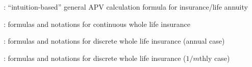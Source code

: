 \item {}: ``intuition-based'' general APV calculation formula for insurance/life annuity
\item {}: formulas and notations for continuous whole life insurance
\item {}: formulas and notations for discrete whole life insurance (annual case)
\item {}: formulas and notations for discrete whole life insurance (\(1/m\)thly case)
